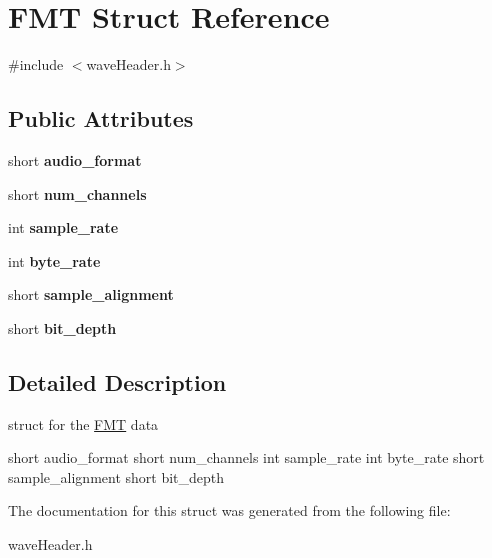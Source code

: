 \hypertarget{structFMT}{}\section{F\+MT Struct Reference}
\label{structFMT}


{\ttfamily \#include $<$wave\+Header.\+h$>$}

\subsection*{Public Attributes}
\begin{DoxyCompactItemize}
\item 
\mbox{\label{structFMT_adfa82d8ed231960ad3811652749bc4f4}} 
short {\bfseries audio\+\_\+format}
\item 
\mbox{\label{structFMT_a553bb5b9d942960581a539a8d3a03293}} 
short {\bfseries num\+\_\+channels}
\item 
\mbox{\label{structFMT_ad09f55ae3078ca9c3545204c4b241910}} 
int {\bfseries sample\+\_\+rate}
\item 
\mbox{\label{structFMT_ada872d0d97744d55e35530140ac22003}} 
int {\bfseries byte\+\_\+rate}
\item 
\mbox{\label{structFMT_a276dd9ac6e17e65d816c7b54f76af43c}} 
short {\bfseries sample\+\_\+alignment}
\item 
\mbox{\label{structFMT_ae26713b307b48900929b3386cc6f8a09}} 
short {\bfseries bit\+\_\+depth}
\end{DoxyCompactItemize}


\subsection{Detailed Description}
struct for the \hyperlink{structFMT}{F\+MT} data

short audio\+\_\+format short num\+\_\+channels int sample\+\_\+rate int byte\+\_\+rate short sample\+\_\+alignment short bit\+\_\+depth 

The documentation for this struct was generated from the following file\+:\begin{DoxyCompactItemize}
\item 
wave\+Header.\+h\end{DoxyCompactItemize}

